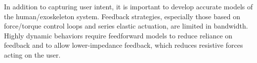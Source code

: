 \documentclass[letterpaper,12pt,fullpage]{article}
\begin{document}
In addition to capturing user intent, it is important to develop accurate models of the human/exoskeleton system.  Feedback strategies, especially those based on force/torque control loops and series elastic actuation, are limited in bandwidth. Highly dynamic behaviors require feedforward models to reduce reliance on feedback and to allow lower-impedance feedback, which reduces resistive forces acting on the user.


\end{document}

